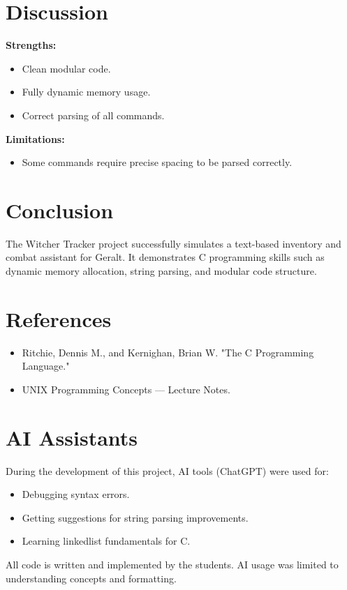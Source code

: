 \documentclass[a4paper,12pt]{article}
\begin{document}
\section{Discussion}
\textbf{Strengths:}
\begin{itemize}
    \item Clean modular code.
    \item Fully dynamic memory usage.
    \item Correct parsing of all commands.
\end{itemize}

\textbf{Limitations:}
\begin{itemize}
    
    \item Some commands require precise spacing to be parsed correctly.
\end{itemize}



\section{Conclusion}
The Witcher Tracker project successfully simulates a text-based inventory and combat assistant for Geralt. It demonstrates C programming skills such as dynamic memory allocation, string parsing, and modular code structure.

\section{References}
\begin{itemize}
\item Ritchie, Dennis M., and Kernighan, Brian W. "The C Programming Language."
\item UNIX Programming Concepts — Lecture Notes.
\end{itemize}

\section*{AI Assistants}
During the development of this project, AI tools (ChatGPT) were used for:
\begin{itemize}
    \item Debugging syntax errors.
    \item Getting suggestions for string parsing improvements.
    \item Learning linkedlist fundamentals for C. 
\end{itemize}

All code is written and implemented by the students. AI usage was limited to understanding concepts and formatting.
\end{document}
